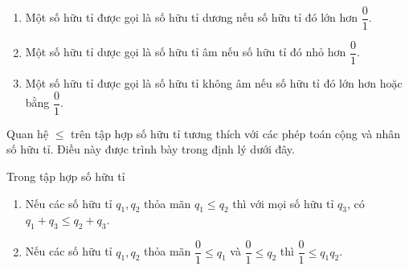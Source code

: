 \begin{definition}
    \begin{enumerate}[label={(\roman*)}]
        \item Một số hữu tỉ được gọi là số hữu tỉ dương nếu số hữu tỉ đó lớn hơn $\dfrac{0}{1}$.
        \item Một số hữu tỉ dược gọi là số hữu tỉ âm nếu số hữu tỉ đó nhỏ hơn $\dfrac{0}{1}$.
        \item Một số hữu tỉ được gọi là số hữu tỉ không âm nếu số hữu tỉ đó lớn hơn hoặc bằng $\dfrac{0}{1}$.
    \end{enumerate}
\end{definition}

Quan hệ $\leq$ trên tập hợp số hữu tỉ tương thích với các phép toán cộng và nhân số hữu tỉ. Điều này được trình bày trong định lý dưới đây.
\begin{theorem}\label{theorem:rational-numbers-order-and-operations}
    Trong tập hợp số hữu tỉ
    \begin{enumerate}[label={(\roman*)}]
        \item Nếu các số hữu tỉ $q_{1}, q_{2}$ thỏa mãn $q_{1}\leq q_{2}$ thì với mọi số hữu tỉ $q_{3}$, có $q_{1} + q_{3}\leq q_{2} + q_{3}$.
        \item Nếu các số hữu tỉ $q_{1}, q_{2}$ thỏa mãn $\dfrac{0}{1}\leq q_{1}$ và $\dfrac{0}{1}\leq q_{2}$ thì $\dfrac{0}{1}\leq q_{1}q_{2}$.
    \end{enumerate}
\end{theorem}

